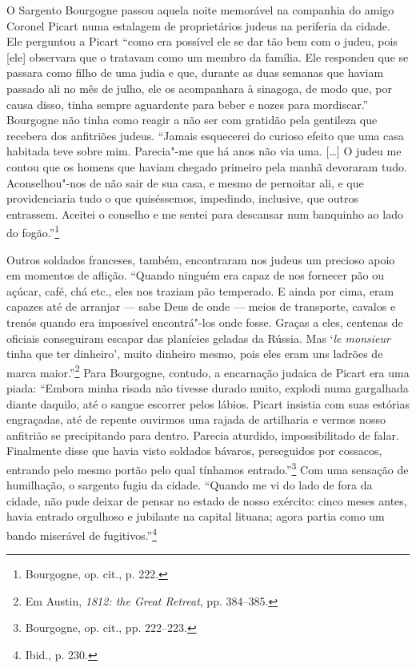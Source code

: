%

O Sargento Bourgogne passou aquela noite memorável na companhia do amigo
Coronel Picart numa estalagem de proprietários judeus na periferia da
cidade. Ele perguntou a Picart ``como era possível ele se dar tão bem
com o judeu, pois {[}ele{]} observara que o tratavam como um membro da
família. Ele respondeu que se passara como filho de uma judia e que,
durante as duas semanas que haviam passado ali no mês de julho, ele os
acompanhara à sinagoga, de modo que, por causa disso, tinha sempre
aguardente para beber e nozes para mordiscar.'' Bourgogne não tinha como
reagir a não ser com gratidão pela gentileza que recebera dos anfitriões
judeus. ``Jamais esquecerei do curioso efeito que uma casa habitada teve
sobre mim. Parecia"-me que há anos não via uma. [\ldots{}] O judeu me
contou que os homens que haviam chegado primeiro pela manhã devoraram
tudo. Aconselhou"-nos de não sair de sua casa, e mesmo de pernoitar ali,
e que providenciaria tudo o que quiséssemos, impedindo, inclusive, que
outros entrassem. Aceitei o conselho e me sentei para descansar num
banquinho ao lado do fogão.''\footnote{Bourgogne, op. cit., p. 222.}

Outros soldados franceses, também, encontraram nos judeus um precioso
apoio em momentos de aflição. ``Quando ninguém era capaz de nos fornecer
pão ou açúcar, café, chá etc., eles nos traziam pão temperado. E ainda
por cima, eram capazes até de arranjar --- sabe Deus de onde --- meios de
transporte, cavalos e trenós quando era impossível encontrá"-los onde
fosse. Graças a eles, centenas de oficiais conseguiram escapar das
planícies geladas da Rússia. Mas `\textit{le monsieur} tinha que ter
dinheiro', muito dinheiro mesmo, pois eles eram uns ladrões de marca
maior.''\footnote{Em Austin, \textit{1812: the Great Retreat}, pp. 384--385.} Para Bourgogne, contudo, a encarnação judaica de Picart era uma piada: ``Embora minha risada não tivesse durado muito, explodi numa
gargalhada diante daquilo, até o sangue escorrer pelos lábios. Picart
insistia com suas estórias engraçadas, até de repente ouvirmos uma
rajada de artilharia e vermos nosso anfitrião se precipitando para
dentro. Parecia aturdido, impossibilitado de falar. Finalmente disse que
havia visto soldados bávaros, perseguidos por cossacos, entrando pelo
mesmo portão pelo qual tínhamos entrado.''\footnote{Bourgogne, op. cit., pp. 222--223.} Com uma sensação de humilhação, o sargento fugiu da cidade. ``Quando me vi do lado de fora da cidade, não pude deixar de
pensar no estado de nosso exército: cinco meses antes, havia entrado
orgulhoso e jubilante na capital lituana; agora partia como um bando
miserável de fugitivos.''\footnote{Ibid., p. 230.}

